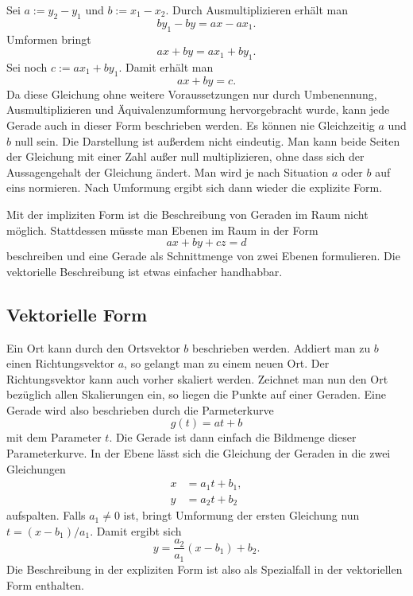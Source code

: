 \documentclass[a4paper,11pt,fleqn,twocolumn,twoside]{article}
\begin{document}
Sei $a:=y_2-y_1$ und $b:=x_1-x_2$. Durch Ausmultiplizieren
erhält man
\begin{equation}
by_1-by=ax-ax_1.
\end{equation}
Umformen bringt
\begin{equation}
ax+by=ax_1+by_1.
\end{equation}
Sei noch $c:=ax_1+by_1$. Damit erhält man
\begin{equation}
ax+by=c.
\end{equation}
Da diese Gleichung ohne weitere Voraussetzungen nur durch Umbenennung,
Ausmultiplizieren und
Äquivalenzumformung hervorgebracht wurde, kann jede Gerade auch
in dieser Form
beschrieben werden. Es können nie Gleichzeitig $a$
und $b$ null sein. Die Darstellung ist außerdem nicht eindeutig.
Man kann beide Seiten der Gleichung mit einer Zahl außer null
multiplizieren, ohne dass sich der Aussagengehalt der Gleichung
ändert. Man wird je nach Situation $a$ oder $b$ auf eins
normieren. Nach Umformung ergibt sich dann wieder die explizite
Form.

Mit der impliziten Form ist die Beschreibung von Geraden im Raum
nicht möglich. Stattdessen müsste man Ebenen im Raum
in der Form
\begin{equation}
ax+by+cz=d
\end{equation}
beschreiben und eine Gerade als Schnittmenge von zwei Ebenen
formulieren. Die vektorielle Beschreibung ist etwas einfacher
handhabbar.

\subsection{Vektorielle Form}

Ein Ort kann durch den Ortsvektor $b$ beschrieben werden.
Addiert man zu $b$ einen Richtungsvektor $a$,
so gelangt man zu einem neuen Ort. Der Richtungsvektor kann auch vorher
skaliert werden. Zeichnet man nun den Ort bezüglich allen Skalierungen ein, so liegen
die Punkte auf einer Geraden. Eine Gerade wird also beschrieben
durch die Parmeterkurve
\begin{equation}
g(t) = at+b
\end{equation}
mit dem Parameter $t$. Die Gerade ist dann einfach die Bildmenge
dieser Parameterkurve. In der Ebene lässt sich die Gleichung
der Geraden in die zwei Gleichungen
\begin{equation}
\begin{split}
x &= a_1 t+b_1,\\
y &= a_2 t+b_2
\end{split}
\end{equation}
aufspalten. Falls $a_1\ne 0$ ist, bringt Umformung der ersten
Gleichung nun $t = (x-b_1)/a_1$.
Damit ergibt sich
\begin{equation}
y = \frac{a_2}{a_1}(x-b_1)+b_2.
\end{equation}
Die Beschreibung in der expliziten Form ist also als Spezialfall
in der vektoriellen Form enthalten.
\end{document}
